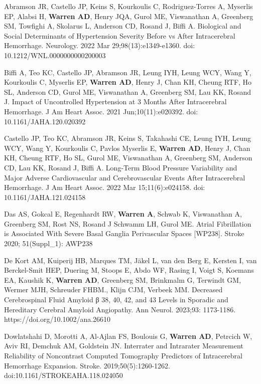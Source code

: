\documentclass[10pt]{article} %
\begin{document}
\begin{thebibliography}{99}

\raggedright

 Abramson JR, Castello JP, Keins S, Kourkoulis C, Rodriguez-Torres A, Myserlis EP, Alabsi H, \textbf{Warren AD}, Henry JQA, Gurol ME, Viswanathan A, Greenberg SM, Towfighi A, Skolarus L, Anderson CD, Rosand J, Biffi A. Biological and Social Determinants of Hypertension Severity Before vs After Intracerebral Hemorrhage. Neurology. 2022 Mar 29;98(13):e1349-e1360. doi: 10.1212/WNL.0000000000200003

 Biffi A, Teo KC, Castello JP, Abramson JR, Leung IYH, Leung WCY, Wang Y, Kourkoulis C, Myserlis EP, \textbf{Warren AD}, Henry J, Chan KH, Cheung RTF, Ho SL, Anderson CD, Gurol ME, Viswanathan A, Greenberg SM, Lau KK, Rosand J. Impact of Uncontrolled Hypertension at 3 Months After Intracerebral Hemorrhage. J Am Heart Assoc. 2021 Jun;10(11):e020392. doi: 10.1161/JAHA.120.020392

 Castello JP, Teo KC, Abramson JR, Keins S, Takahashi CE, Leung IYH, Leung WCY, Wang Y, Kourkoulis C,
Pavlos Myserlis E, \textbf{Warren AD}, Henry J, Chan KH, Cheung RTF, Ho SL, Gurol ME, Viswanathan A, Greenberg
SM, Anderson CD, Lau KK, Rosand J, Biffi A. Long-Term Blood Pressure Variability and Major Adverse
Cardiovascular and Cerebrovascular Events After Intracerebral Hemorrhage. J Am Heart Assoc. 2022 Mar
15;11(6):e024158. doi: 10.1161/JAHA.121.024158

 Das AS, Gokcal E, Regenhardt RW, \textbf{Warren A}, Schwab K, Viswanathan A, Greenberg SM, Rost NS, Rosand J Schwamm LH, Gurol ME. Atrial Fibrillation is Associated With Severe Basal Ganglia Perivascular Spaces [WP238]. Stroke 2020; 51(Suppl\_1): AWP238

 De Kort AM, Kuiperij HB, Marques TM, Jäkel L, van den Berg E, Kersten I, van Berckel-Smit HEP, Duering M, Stoops E, Abdo WF, Rasing I, Voigt S, Koemans EA, Kaushik K, \textbf{Warren AD}, Greenberg SM, Brinkmalm G, Terwindt GM, Wermer MJH, Schreuder FHBM., Klijn CJM, Verbeek MM. Decreased Cerebrospinal Fluid Amyloid β 38, 40, 42, and 43 Levels in Sporadic and Hereditary Cerebral Amyloid Angiopathy. Ann Neurol. 2023;93: 1173-1186. https://doi.org/10.1002/ana.26610

 Dowlatshahi D, Morotti A, Al-Ajlan FS, Boulouis G, \textbf{Warren AD}, Petrcich W, Aviv RI, Demchuk AM, Goldstein JN. Interrater and Intrarater Measurement Reliability of Noncontrast Computed Tomography Predictors of Intracerebral Hemorrhage Expansion. Stroke. 2019;50(5):1260-1262. doi:10.1161/STROKEAHA.118.024050


\end{thebibliography}
\end{document}
